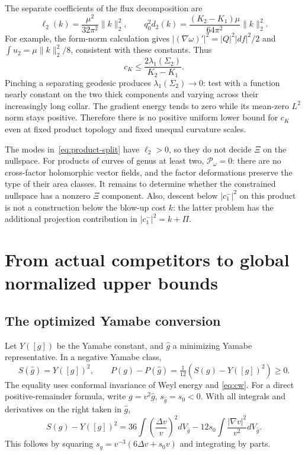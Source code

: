 \documentclass[11pt]{article}
\theoremstyle{definition}
\theoremstyle{remark}
\begin{document}
The separate coefficients of the flux decomposition are
\begin{equation}
 \ell_2(k)=\frac{\mu^2}{32\pi^2}\|k\|_2^2,
 \qquad
 q_0^2d_2(k)=\frac{(K_2-K_1)\mu}{64\pi^2}\|k\|_2^2.
 \label{eq:product-split}
\end{equation}
For example, the form-norm calculation gives
$|(\nabla\omega)'|^2=|Q|^2|df|^2/2$ and
$\int u_2=\mu\|k\|_2^2/8$, consistent with these constants.
Thus
\begin{equation}
 \boxed{c_K\le\frac{2\lambda_1(\Sigma_2)}{K_2-K_1}.}
 \label{eq:spectral-degeneration}
\end{equation}
Pinching a separating geodesic produces $\lambda_1(\Sigma_2)\to0$:
test with a function nearly constant on the two thick components and
varying across their increasingly long collar. The gradient energy tends
to zero while its mean-zero $L^2$ norm stays positive. Therefore there is
no positive uniform lower bound for $c_K$ even at fixed product topology
and fixed unequal curvature scales.

The modes in~\eqref{eq:product-split} have $\ell_2>0$, so they do not
decide $\Xi$ on the nullspace. For products of curves of genus at least
two, $\mathcal P_\omega=0$: there are no cross-factor holomorphic vector
fields, and the factor deformations preserve the type of their area
classes. It remains to determine whether the constrained nullspace has
a nonzero $\Xi$ component. Also, descent below $|c_1^-|^2$ on this
product is not a construction below the blow-up cost $k$: the latter
problem has the additional projection contribution in
$|c_1^-|^2=k+\Pi$.

\section{From actual competitors to global normalized upper bounds}
\label{sec:upper}

\subsection{The optimized Yamabe conversion}

Let $Y([g])$ be the Yamabe constant, and $\widehat g$ a minimizing
Yamabe representative. In a negative Yamabe class,
\begin{equation}
 S(\widehat g)=Y([g])^2,
 \qquad P(g)-P(\widehat g)=\tfrac1{12}(S(g)-Y([g])^2)\ge0.
 \label{eq:Yamabe-P}
\end{equation}
The equality uses conformal invariance of Weyl energy and
\eqref{eq:cw}. For a direct positive-remainder formula, write
$g=v^2\widehat g$, $s_{\widehat g}=s_0<0$. With all integrals and
derivatives on the right taken in $\widehat g$,
\begin{equation}
 S(g)-Y([g])^2
 =36\int\left(\frac{\Delta v}{v}\right)^2dV_{\widehat g}
       -12s_0\int\frac{|\nabla v|^2}{v^2}dV_{\widehat g}.
 \label{eq:Yamabe-exact}
\end{equation}
This follows by squaring
$s_g=v^{-3}(6\Delta v+s_0v)$ and integrating by parts.
\end{document}
